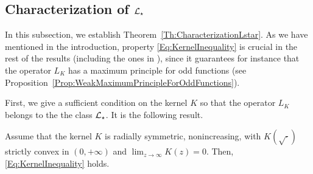 \subsection{Characterization of $\mathcal{L}_\star$}

In this subsection, we establish Theorem~\ref{Th:CharacterizationLstar}. As we have mentioned in the introduction, property \eqref{Eq:KernelInequality} is crucial in the rest of the results (including the ones in \cite{FelipeSanz-Perela:IntegroDifferentialII}), since it guarantees for instance that the operator $L_K$ has a maximum principle for odd functions (see Proposition~\ref{Prop:WeakMaximumPrincipleForOddFunctions}).

First, we give a sufficient condition on the kernel $K$ so that the operator $L_K$ belongs to the the class $\mathcal{L}_\star$. It is the following result.

\begin{proposition}
\label{Prop:KernelInequalitySufficientCondition} Assume that the kernel $K$ is radially symmetric, nonincreasing, with $K(\sqrt{\cdot})$ strictly convex in $(0,+\infty)$ and $\lim_{z\to\infty} K(z) = 0$. Then, \eqref{Eq:KernelInequality} holds.
\end{proposition}


